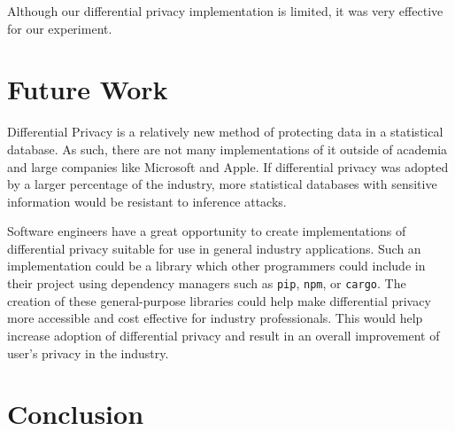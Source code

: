 \documentclass[conference,11pt]{IEEEtran}
\begin{document}
Although our differential privacy implementation is limited, it was very
effective for our experiment.

\section{Future Work}\label{sec:future-work}
Differential Privacy is a relatively new method of protecting data in a
statistical database. As such, there are not many implementations of it outside
of academia and large companies like Microsoft and Apple. If differential
privacy was adopted by a larger percentage of the industry, more statistical
databases with sensitive information would be resistant to inference attacks.

Software engineers have a great opportunity to create implementations of
differential privacy suitable for use in general industry applications. Such an
implementation could be a library which other programmers could include in their
project using dependency managers such as \texttt{pip}, \texttt{npm}, or
\texttt{cargo}. The creation of these general-purpose libraries could help make
differential privacy more accessible and cost effective for industry
professionals. This would help increase adoption of differential privacy and
result in an overall improvement of user's privacy in the industry.

\section{Conclusion}\label{sec:conclusion}

{\printbibliography}
\end{document}
